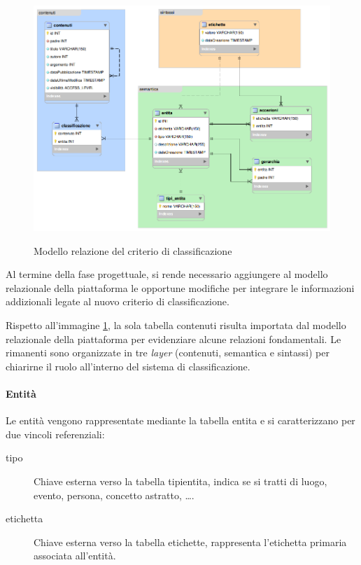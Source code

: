 \begin{figure}[ht]
\begin{center}
\includegraphics[width=14.7cm]{modello-er.png}
\label{fig:tesi:stage:er:modello}
\caption{Modello relazione del criterio di classificazione}
\end{center}
\end{figure}

Al termine della fase progettuale, si rende necessario aggiungere al modello relazionale della piattaforma le opportune modifiche per integrare le informazioni addizionali legate al nuovo criterio di classificazione.

Rispetto all'immagine \ref{fig:tesi:stage:er:modello}, la sola tabella \textsf{contenuti} risulta importata dal modello relazionale della piattaforma per evidenziare alcune relazioni fondamentali. Le rimanenti sono organizzate in tre \textit{layer} (\textsf{contenuti}, \textsf{semantica} e \textsf{sintassi}) per chiarirne il ruolo all'interno del sistema di classificazione.

\paragraph{Entità}
Le entità vengono rappresentate mediante la tabella \textsf{entita} e si caratterizzano per due vincoli referenziali:
\begin{description}
\item[tipo] 
Chiave esterna verso la tabella \textsf{tipi\textunderscore entita}, indica se si tratti di luogo, evento, persona, concetto astratto, \ldots. 
\item[etichetta]
Chiave esterna verso la tabella \textsf{etichette}, rappresenta l'etichetta primaria associata all'entità.
\end{description}

